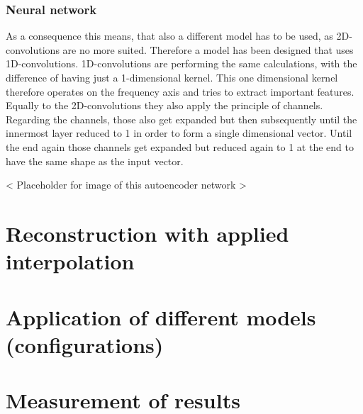 \subsubsection{Neural network}
As a consequence this means, that also a different model has to be used, as 2D-convolutions are no more suited. Therefore a model has been designed that uses 1D-convolutions. 1D-convolutions are performing the same calculations, with the difference of having just a 1-dimensional kernel. This one dimensional kernel therefore operates on the frequency axis and tries to extract important features. Equally to the 2D-convolutions they also apply the principle of channels. Regarding the channels, those also get expanded but then subsequently until the innermost layer reduced to 1 in order to form a single dimensional vector. Until the end again those channels get expanded but reduced again to 1 at the end to have the same shape as the input vector. 

< Placeholder for image of this autoencoder network >

\section{Reconstruction with applied interpolation}

\section{Application of different models (configurations)}

\section{Measurement of results}